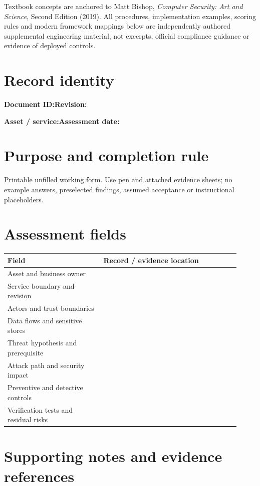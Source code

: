 \documentclass[10pt,letterpaper]{article}
\begin{document}
\makedoctocpage
\begin{notebox}
Textbook concepts are anchored to Matt Bishop, \emph{Computer Security: Art and Science}, Second Edition (2019). All procedures, implementation examples, scoring rules and modern framework mappings below are independently authored supplemental engineering material, not excerpts, official compliance guidance or evidence of deployed controls.
\end{notebox}
\section{Record identity}
\textbf{Document ID:}\enspace\hrulefill\quad\textbf{Revision:}\enspace\hrulefill
\par\medskip\textbf{Asset / service:}\enspace\hrulefill\quad\textbf{Assessment date:}\enspace\hrulefill
\section{Purpose and completion rule}
Printable unfilled working form. Use pen and attached evidence sheets; no example answers, preselected findings, assumed acceptance or instructional placeholders.
\section{Assessment fields}
\renewcommand{\arraystretch}{1.8}
\begin{longtable}{@{}p{0.38\linewidth}p{0.54\linewidth}@{}}
\toprule\textbf{Field}&\textbf{Record / evidence location}\\\midrule\endhead
Asset and business owner & \rule{0pt}{1.3cm}\\\midrule
Service boundary and revision & \rule{0pt}{1.3cm}\\\midrule
Actors and trust boundaries & \rule{0pt}{1.3cm}\\\midrule
Data flows and sensitive stores & \rule{0pt}{1.3cm}\\\midrule
Threat hypothesis and prerequisite & \rule{0pt}{1.3cm}\\\midrule
Attack path and security impact & \rule{0pt}{1.3cm}\\\midrule
Preventive and detective controls & \rule{0pt}{1.3cm}\\\midrule
Verification tests and residual risks & \rule{0pt}{1.3cm}\\\midrule
\bottomrule\end{longtable}
\section{Supporting notes and evidence references}
\end{document}
